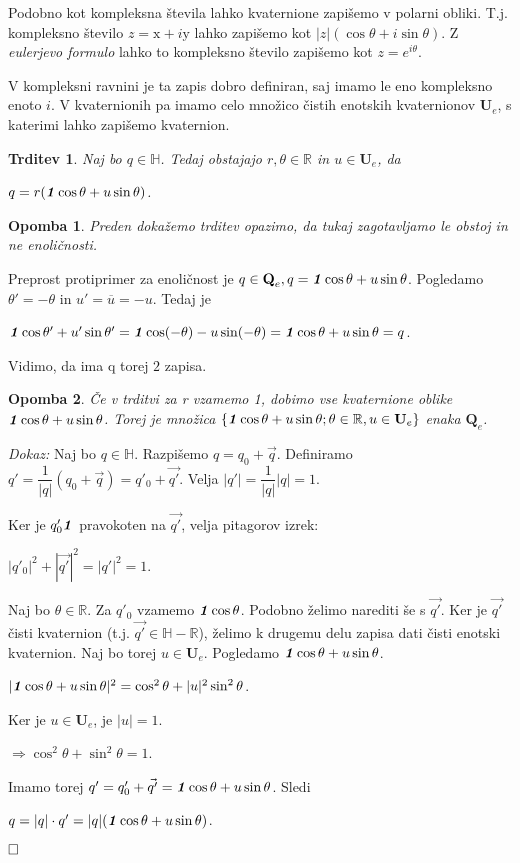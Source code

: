 \documentclass[a4paper,12pt]{article}
\def\R{\mathbb{R}} %
\def\H{\mathbb{H}} %
\def\Qe{\textbf{Q}_{e}} %
\def\Ue{\textbf{U}_{e}} %
\def\1{\textbf{\emph{1}}}
\newcommand{\conj}[1]{\overline{#1}}
\def\qed{$\hfill\Box$}   %
\newtheorem{trditev}{Trditev}
\newtheorem{opomba}{Opomba}
\begin{document}
Podobno kot kompleksna števila lahko kvaternione zapišemo v polarni obliki. T.j.
kompleksno število $z = \text{x} + i\text{y}$ lahko zapišemo kot $|z|( \cos\theta + i\sin\theta )$. Z \emph{eulerjevo formulo} lahko to kompleksno število
zapišemo kot $z = e^{i\theta}$.

V kompleksni ravnini je ta zapis dobro definiran, saj imamo le eno kompleksno enoto $i$.
V kvaternionih pa imamo celo množico čistih enotskih kvaternionov $\Ue$, s katerimi lahko zapišemo kvaternion.

\begin{trditev}
Naj bo $q \in \H$. Tedaj obstajajo $r, \theta \in \R$ in $u \in \Ue$, da
\begin{center}
   $q = r (\1\cos\theta + u\sin\theta)$.
\end{center}
\end{trditev}

\begin{opomba}
Preden dokažemo trditev opazimo, da tukaj zagotavljamo \emph{le obstoj} in ne enoličnosti.

\end{opomba}
Preprost protiprimer za enoličnost je $q \in \Qe, q = \1\cos\theta + u\sin\theta$.
Pogledamo $\theta' = -\theta$ in $u' = \conj{u} = -u$. Tedaj je
\begin{center}
   $\1\cos\theta' + u'\sin\theta' = \1\cos(-\theta) -u\sin(-\theta) = \1\cos\theta + u\sin\theta = q$.
\end{center}
Vidimo, da ima q torej $2$ zapisa.


\begin{opomba}
Če v trditvi za r vzamemo 1, dobimo vse kvaternione oblike $\1\cos\theta + u\sin\theta$. Torej je množica
$\left\{ \1\cos\theta + u\sin\theta; \theta \in \R , u \in \Ue \right\} $ enaka $\Qe$.
\end{opomba}

\noindent
{\em Dokaz:\/} Naj bo $q \in \H$. Razpišemo $q = q_{0} + \vec{q}$.
Definiramo $q' = \dfrac{1}{|q|}(q_{0} + \vec{q}) = q'_{0} + \vec{q'}$. Velja $|q'| = \dfrac{1}{|q|}|q| = 1$. 

\break
\noindent
Ker je $q'_{0}\1$ pravokoten na $\vec{q'}$, velja pitagorov izrek:
\begin{center}
   $|q'_{0}|^2 + |\vec{q'}|^2 = |q'|^2 = 1$.
\end{center} 
Naj bo $\theta \in \R$. Za $q'_{0}$ vzamemo $\1\cos\theta$. Podobno želimo narediti še s $\vec{q'}$.
Ker je $\vec{q'}$ čisti kvaternion (t.j. $\vec{q'} \in \H - \R$), želimo k drugemu delu zapisa dati čisti enotski kvaternion.
Naj bo torej $u \in \Ue$. Pogledamo $\1\cos\theta + u\sin\theta$.
\begin{center}
   $|\1\cos\theta + u\sin\theta|^2 = \cos^2\theta + |u|^2\sin^2\theta$. 
\end{center}
Ker je $u \in \Ue$, je $|u| = 1$.
\begin{center}
   $\Rightarrow \cos^2\theta + \sin^2\theta = 1$.
\end{center}
Imamo torej $q' = q'_{0} + \vec{q'} = \1\cos\theta + u\sin\theta$.
Sledi 
\begin{center}
   $q = |q| \cdot q' = |q|(\1\cos\theta + u\sin\theta)$.
\end{center}
\qed
\end{document}
